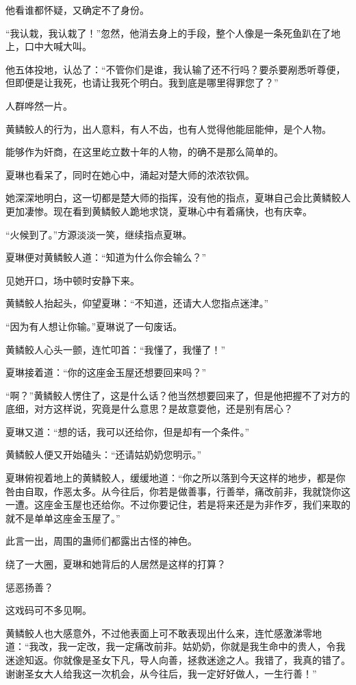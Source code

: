 \begin{this_body}
他看谁都怀疑，又确定不了身份。

“我认栽，我认栽了！”忽然，他消去身上的手段，整个人像是一条死鱼趴在了地上，口中大喊大叫。

他五体投地，认怂了：“不管你们是谁，我认输了还不行吗？要杀要剐悉听尊便，但即便是让我死，也请让我死个明白。我到底是哪里得罪您了？”

人群哗然一片。

黄鳞鲛人的行为，出人意料，有人不齿，也有人觉得他能屈能伸，是个人物。

能够作为奸商，在这里屹立数十年的人物，的确不是那么简单的。

夏琳也看呆了，同时在她心中，涌起对楚大师的浓浓钦佩。

她深深地明白，这一切都是楚大师的指挥，没有他的指点，夏琳自己会比黄鳞鲛人更加凄惨。现在看到黄鳞鲛人跪地求饶，夏琳心中有着痛快，也有庆幸。

“火候到了。”方源淡淡一笑，继续指点夏琳。

夏琳便对黄鳞鲛人道：“知道为什么你会输么？”

见她开口，场中顿时安静下来。

黄鳞鲛人抬起头，仰望夏琳：“不知道，还请大人您指点迷津。”

“因为有人想让你输。”夏琳说了一句废话。

黄鳞鲛人心头一颤，连忙叩首：“我懂了，我懂了！”

夏琳接着道：“你的这座金玉屋还想要回来吗？”

“啊？”黄鳞鲛人愣住了，这是什么话？他当然想要回来了，但是他把握不了对方的底细，对方这样说，究竟是什么意思？是故意耍他，还是别有居心？

夏琳又道：“想的话，我可以还给你，但是却有一个条件。”

黄鳞鲛人便又开始磕头：“还请姑奶奶您明示。”

夏琳俯视着地上的黄鳞鲛人，缓缓地道：“你之所以落到今天这样的地步，都是你咎由自取，作恶太多。从今往后，你若是做善事，行善举，痛改前非，我就饶你这一遭。这座金玉屋也还给你。不过你要记住，若是将来还是为非作歹，我们来取的就不是单单这座金玉屋了。”

此言一出，周围的蛊师们都露出古怪的神色。

绕了一大圈，夏琳和她背后的人居然是这样的打算？

惩恶扬善？

这戏码可不多见啊。

黄鳞鲛人也大感意外，不过他表面上可不敢表现出什么来，连忙感激涕零地道：“我改，我一定改，我一定痛改前非。姑奶奶，你就是我生命中的贵人，令我迷途知返。你就像是圣女下凡，导人向善，拯救迷途之人。我错了，我真的错了。谢谢圣女大人给我这一次机会，从今往后，我一定好好做人，一生行善！”


\end{this_body}
